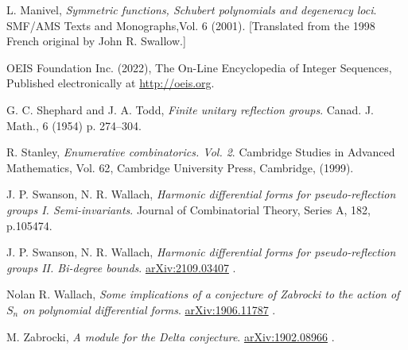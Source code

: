 \documentclass[submission]{FPSAC2023}
\theoremstyle{definition}
\numberwithin{equation}{section}
\begin{document}
\begin{thebibliography}{999}
 L. Manivel,
\textit{Symmetric functions, {S}chubert polynomials and degeneracy loci}.
SMF/AMS Texts and Monographs,Vol. {6} (2001).
[Translated from the 1998 French original by John R. Swallow.]

 OEIS Foundation Inc. (2022),
The On-Line Encyclopedia of Integer Sequences, Published electronically at
\href{http://oeis.org}{http://oeis.org}.

 G. C. Shephard and J. A. Todd,
\textit{Finite unitary reflection groups}.
Canad. J. Math., 6 (1954) p. 274--304.

 R. Stanley,
\textit{Enumerative combinatorics. {V}ol. 2}.
{Cambridge Studies in Advanced Mathematics}, Vol. {62},
{Cambridge University Press, Cambridge}, (1999).

 J. P. Swanson, N. R. Wallach,
\textit{Harmonic differential forms for pseudo-reflection groups I. Semi-invariants}.
Journal of Combinatorial Theory, Series A, 182, p.105474.

 J. P. Swanson, N. R. Wallach,
\textit{Harmonic differential forms for pseudo-reflection groups II. Bi-degree bounds}.
\href{https://arxiv.org/abs/2109.03407}{arXiv:2109.03407} .

 Nolan R. Wallach,
\textit{Some implications of a conjecture of Zabrocki
to the action of $S_n$ on polynomial differential forms}.
\href{https://arxiv.org/abs/1906.11787}{arXiv:1906.11787} .

 M. Zabrocki,
\textit{A module for the Delta conjecture}.
\href{https://arxiv.org/abs/1902.08966}{arXiv:1902.08966} .

\end{thebibliography}
\end{document}
